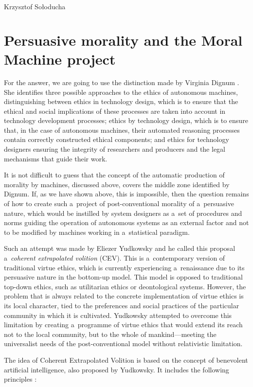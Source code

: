 \begin{artengenv}{Krzysztof Sołoducha}
\section*{Persuasive morality and the Moral Machine project}
For the answer, we are going to use the distinction made by Virginia Dignum
\parencite*[][]{dignum_responsible_2022}. %
 She identifies three possible approaches to the ethics of autonomous machines, distinguishing between ethics in technology design, which is to ensure that the ethical and social implications of these processes are taken into account in technology development processes; ethics by technology design, which is to ensure that, in the case of autonomous machines, their automated reasoning processes contain correctly constructed ethical components; and ethics for technology designers ensuring the integrity of researchers and producers and the legal mechanisms that guide their work.

It is not difficult to guess that the concept of the automatic production of morality by machines, discussed above, covers the middle zone identified by Dignum. If, as we have shown above, this is impossible, then the question remains of how to create such a~project of post-conventional morality of a~persuasive nature, which would be instilled by system designers as a~set of procedures and norms guiding the operation of autonomous systems as an external factor and not to be modified by machines working in a~statistical paradigm.

Such an attempt was made by Eliezer Yudkowsky
\parencite*[][]{yudkowsky_coherent_2004} %
 and he called this proposal a~\textit{coherent extrapolated volition} (CEV). This is a~contemporary version of traditional virtue ethics, which is currently experiencing a~renaissance due to its persuasive nature in the bottom-up model. This model is opposed to traditional top-down ethics, such as utilitarian ethics or deontological systems. However, the problem that is always related to the concrete implementation of virtue ethics is its local character, tied to the preferences and social practices of the particular community in which it is cultivated. Yudkowsky attempted to overcome this limitation by creating a~programme of virtue ethics that would extend its reach not to the local community, but to the whole of mankind—meeting the universalist needs of the post-conventional model without relativistic limitation.

The idea of Coherent Extrapolated Volition is based on the concept of benevolent artificial intelligence, also proposed by Yudkowsky. It includes the following principles
\parencite[][]{yudkowsky_coherent_2004}:%



\end{artengenv}
